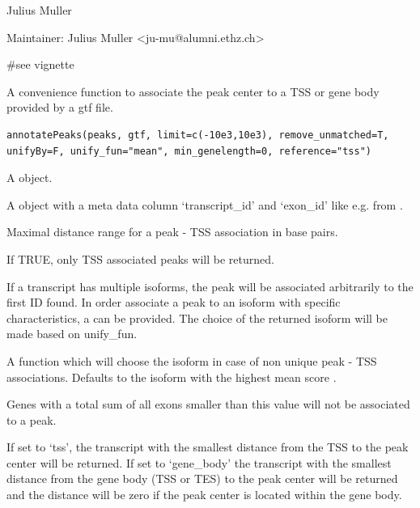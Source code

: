 \documentclass[letterpaper]{book}
\begin{document}
%
\begin{Author}
Julius Muller

Maintainer: Julius Muller <ju-mu@alumni.ethz.ch>

\end{Author}
%
\begin{Examples}
\begin{ExampleCode}
#see vignette
\end{ExampleCode}
\end{Examples}
%
\begin{Description}
A convenience function to associate the peak center to a TSS or gene body provided by a gtf file. 
\end{Description}
%
\begin{Usage}
\begin{verbatim}
annotatePeaks(peaks, gtf, limit=c(-10e3,10e3), remove_unmatched=T, unifyBy=F, unify_fun="mean", min_genelength=0, reference="tss")
\end{verbatim}
\end{Usage}
%
\begin{Arguments}
\begin{ldescription}
\item[\code{peaks}] 
A  object. 

\item[\code{gtf}] 
A  object with a meta data column `transcript\_id' and `exon\_id' like e.g. from . 

\item[\code{limit}] 
Maximal distance range for a peak - TSS association in base pairs.  

\item[\code{remove\_unmatched}] 
If TRUE, only TSS associated peaks will be returned.

\item[\code{unifyBy}] 
If a transcript has multiple isoforms, the peak will be associated arbitrarily to the first ID found. In order associate a peak to an isoform with specific characteristics, a  can be provided. The choice of the returned isoform will be made based on unify\_fun.

\item[\code{unify\_fun}] 
A function which will choose the isoform in case of non unique peak - TSS associations. Defaults to the isoform with the highest mean score .

\item[\code{min\_genelength}] 
Genes with a total sum of all exons smaller than this value will not be associated to a peak.

\item[\code{reference}] 
If set to `tss', the transcript with the smallest distance from the TSS to the peak center will be returned. If set to `gene\_body' the transcript with the smallest distance from the gene body (TSS or TES) to the peak center will be returned and the distance will be zero if the peak center is located within the gene body.  

\end{ldescription}
\end{Arguments}
\end{document}
